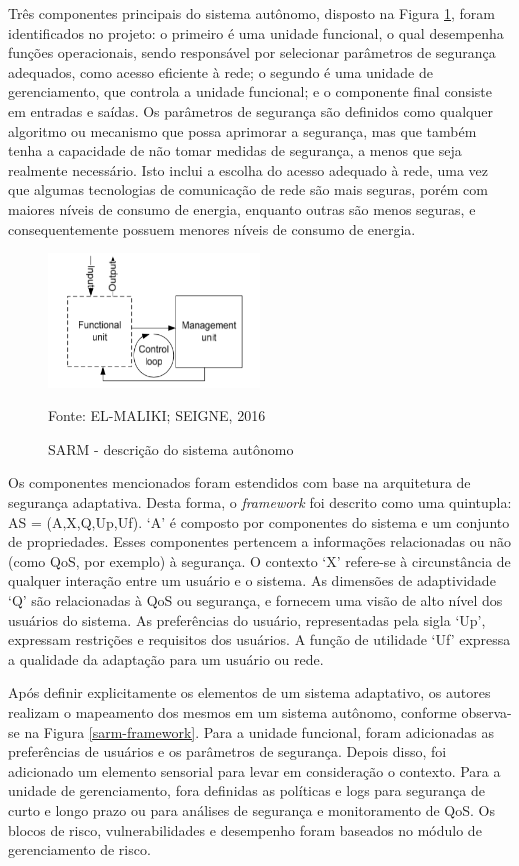 \documentclass[tid,table]{texufpel} %
\begin{document}
Três componentes principais do sistema autônomo, disposto na Figura \ref{sarm-description}, foram identificados no projeto: o primeiro é uma unidade funcional, o qual desempenha funções operacionais, sendo responsável por selecionar parâmetros de segurança adequados, como acesso eficiente à rede; o segundo é uma unidade de gerenciamento, que controla a unidade funcional; e o componente final consiste em entradas e saídas. Os parâmetros de segurança são definidos como qualquer algoritmo ou mecanismo que possa aprimorar a segurança, mas que também tenha a capacidade de não tomar medidas de segurança, a menos que seja realmente necessário. Isto inclui a escolha do acesso adequado à rede, uma vez que algumas tecnologias de comunicação de rede são mais seguras, porém com maiores níveis de consumo de energia, enquanto outras são menos seguras, e consequentemente possuem menores níveis de consumo de energia.

\begin{figure}[ht]
\centering
\includegraphics[width=0.5\textwidth]{imagens/sarm-description.png}
\caption{SARM - descrição do sistema autônomo}
\label{sarm-description}
Fonte: EL-MALIKI; SEIGNE, 2016
\end{figure}


Os componentes mencionados foram estendidos com base na arquitetura de segurança adaptativa. Desta forma, o \textit{framework} foi descrito como uma quintupla: AS = (A,X,Q,Up,Uf). `A' é composto por componentes do sistema e um conjunto de propriedades. Esses componentes pertencem a informações relacionadas ou não (como QoS, por exemplo) à segurança.  O contexto `X' refere-se à circunstância de qualquer interação entre um usuário e o sistema. As dimensões de adaptividade `Q' são relacionadas à QoS ou segurança, e fornecem uma visão de alto nível dos usuários do sistema. As preferências do usuário, representadas pela sigla `Up', expressam restrições e requisitos dos usuários. A função de utilidade `Uf' expressa a qualidade da adaptação para um usuário ou rede.

Após definir explicitamente os elementos de um sistema adaptativo, os autores realizam o mapeamento dos mesmos em um sistema autônomo, conforme observa-se na Figura \ref{sarm-framework}. Para a unidade funcional, foram adicionadas as preferências de usuários e os parâmetros de segurança. Depois disso, foi adicionado um elemento sensorial para levar em consideração o contexto. Para a unidade de gerenciamento, fora definidas as políticas e logs para segurança de curto e longo prazo  ou para análises de segurança e monitoramento de QoS.  Os blocos de risco, vulnerabilidades e desempenho foram baseados no módulo de gerenciamento de risco.
\end{document}
